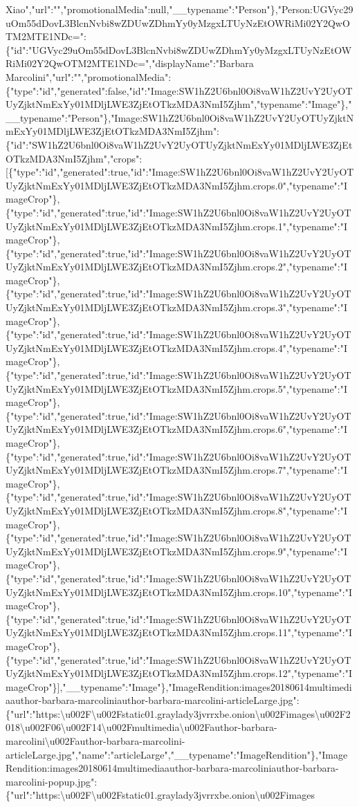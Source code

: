 Xiao","url":"","promotionalMedia":null,"\_\_typename":"Person"\},"Person:UGVyc29uOm55dDovL3BlcnNvbi8wZDUwZDhmYy0yMzgxLTUyNzEtOWRiMi02Y2QwOTM2MTE1NDc=":\{"id":"UGVyc29uOm55dDovL3BlcnNvbi8wZDUwZDhmYy0yMzgxLTUyNzEtOWRiMi02Y2QwOTM2MTE1NDc=","displayName":"Barbara
Marcolini","url":"","promotionalMedia":\{"type":"id","generated":false,"id":"Image:SW1hZ2U6bnl0Oi8vaW1hZ2UvY2UyOTUyZjktNmExYy01MDljLWE3ZjEtOTkzMDA3NmI5Zjhm","typename":"Image"\},"\_\_typename":"Person"\},"Image:SW1hZ2U6bnl0Oi8vaW1hZ2UvY2UyOTUyZjktNmExYy01MDljLWE3ZjEtOTkzMDA3NmI5Zjhm":\{"id":"SW1hZ2U6bnl0Oi8vaW1hZ2UvY2UyOTUyZjktNmExYy01MDljLWE3ZjEtOTkzMDA3NmI5Zjhm","crops":{[}\{"type":"id","generated":true,"id":"Image:SW1hZ2U6bnl0Oi8vaW1hZ2UvY2UyOTUyZjktNmExYy01MDljLWE3ZjEtOTkzMDA3NmI5Zjhm.crops.0","typename":"ImageCrop"\},\{"type":"id","generated":true,"id":"Image:SW1hZ2U6bnl0Oi8vaW1hZ2UvY2UyOTUyZjktNmExYy01MDljLWE3ZjEtOTkzMDA3NmI5Zjhm.crops.1","typename":"ImageCrop"\},\{"type":"id","generated":true,"id":"Image:SW1hZ2U6bnl0Oi8vaW1hZ2UvY2UyOTUyZjktNmExYy01MDljLWE3ZjEtOTkzMDA3NmI5Zjhm.crops.2","typename":"ImageCrop"\},\{"type":"id","generated":true,"id":"Image:SW1hZ2U6bnl0Oi8vaW1hZ2UvY2UyOTUyZjktNmExYy01MDljLWE3ZjEtOTkzMDA3NmI5Zjhm.crops.3","typename":"ImageCrop"\},\{"type":"id","generated":true,"id":"Image:SW1hZ2U6bnl0Oi8vaW1hZ2UvY2UyOTUyZjktNmExYy01MDljLWE3ZjEtOTkzMDA3NmI5Zjhm.crops.4","typename":"ImageCrop"\},\{"type":"id","generated":true,"id":"Image:SW1hZ2U6bnl0Oi8vaW1hZ2UvY2UyOTUyZjktNmExYy01MDljLWE3ZjEtOTkzMDA3NmI5Zjhm.crops.5","typename":"ImageCrop"\},\{"type":"id","generated":true,"id":"Image:SW1hZ2U6bnl0Oi8vaW1hZ2UvY2UyOTUyZjktNmExYy01MDljLWE3ZjEtOTkzMDA3NmI5Zjhm.crops.6","typename":"ImageCrop"\},\{"type":"id","generated":true,"id":"Image:SW1hZ2U6bnl0Oi8vaW1hZ2UvY2UyOTUyZjktNmExYy01MDljLWE3ZjEtOTkzMDA3NmI5Zjhm.crops.7","typename":"ImageCrop"\},\{"type":"id","generated":true,"id":"Image:SW1hZ2U6bnl0Oi8vaW1hZ2UvY2UyOTUyZjktNmExYy01MDljLWE3ZjEtOTkzMDA3NmI5Zjhm.crops.8","typename":"ImageCrop"\},\{"type":"id","generated":true,"id":"Image:SW1hZ2U6bnl0Oi8vaW1hZ2UvY2UyOTUyZjktNmExYy01MDljLWE3ZjEtOTkzMDA3NmI5Zjhm.crops.9","typename":"ImageCrop"\},\{"type":"id","generated":true,"id":"Image:SW1hZ2U6bnl0Oi8vaW1hZ2UvY2UyOTUyZjktNmExYy01MDljLWE3ZjEtOTkzMDA3NmI5Zjhm.crops.10","typename":"ImageCrop"\},\{"type":"id","generated":true,"id":"Image:SW1hZ2U6bnl0Oi8vaW1hZ2UvY2UyOTUyZjktNmExYy01MDljLWE3ZjEtOTkzMDA3NmI5Zjhm.crops.11","typename":"ImageCrop"\},\{"type":"id","generated":true,"id":"Image:SW1hZ2U6bnl0Oi8vaW1hZ2UvY2UyOTUyZjktNmExYy01MDljLWE3ZjEtOTkzMDA3NmI5Zjhm.crops.12","typename":"ImageCrop"\}{]},"\_\_typename":"Image"\},"ImageRendition:images20180614multimediaauthor-barbara-marcoliniauthor-barbara-marcolini-articleLarge.jpg":\{"url":"https:\textbackslash{}u002F\textbackslash{}u002Fstatic01.graylady3jvrrxbe.onion\textbackslash{}u002Fimages\textbackslash{}u002F2018\textbackslash{}u002F06\textbackslash{}u002F14\textbackslash{}u002Fmultimedia\textbackslash{}u002Fauthor-barbara-marcolini\textbackslash{}u002Fauthor-barbara-marcolini-articleLarge.jpg","name":"articleLarge","\_\_typename":"ImageRendition"\},"ImageRendition:images20180614multimediaauthor-barbara-marcoliniauthor-barbara-marcolini-popup.jpg":\{"url":"https:\textbackslash{}u002F\textbackslash{}u002Fstatic01.graylady3jvrrxbe.onion\textbackslash{}u002Fimages\textbackslas